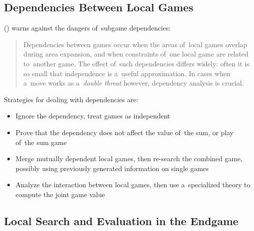 \subsection{Dependencies Between Local Games}
\label{ssec:dependencies-of-subgames}

(\cite{Muller1995computer}) warns against the dangers of~subgame dependencies:

\begin{quotation}
  Dependencies between games occur when the areas of~local games overlap during area expansion, and when constraints of~one local game are related to~another game.
  The effect of~such dependencies differs widely:
  often it is so small that independence is a~useful approximation.
  In cases when a~move works as a~\emph{double threat} however, dependency analysis is crucial.
\end{quotation}

Strategies for dealing with dependencies are:
\begin{itemize}
  \item Ignore the dependency, treat games as independent
  \item Prove that the dependency does not affect the value of~the sum, or play of~the sum game
  \item Merge mutually dependent local games, then re-search the combined game, possibly using previously generated information on single games
  \item Analyze the interaction between local games, then use a~specialized theory to compute the joint game value
\end{itemize}

\subsection{Local Search and Evaluation in the Endgame}

